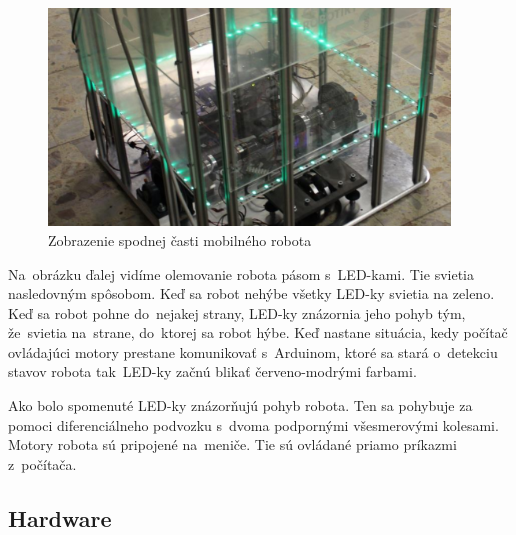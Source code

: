 \begin{figure}[!htbp]
	\begin{center}
		\includegraphics[width=0.95\textwidth]{img/robot.png}
	\end{center}
	\caption{Zobrazenie spodnej časti mobilného robota~\cite{timovyProjekt}}
	\label{fig:robot}
\end{figure}

\noindent Na~obrázku ďalej vidíme olemovanie robota pásom s~LED-kami. Tie svietia nasledovným spôsobom. Keď sa robot nehýbe všetky LED-ky svietia
na zeleno. Keď sa robot pohne do~nejakej strany, LED-ky znázornia jeho pohyb tým, že~svietia na~strane, do~ktorej sa robot hýbe. Keď nastane
situácia, kedy počítač ovládajúci motory prestane komunikovať s~Arduinom, ktoré sa stará o~detekciu stavov robota tak~LED-ky začnú blikať
červeno-modrými farbami.

Ako bolo spomenuté LED-ky znázorňujú pohyb robota. Ten sa pohybuje za pomoci diferenciálneho podvozku s~dvoma podpornými všesmerovými kolesami.
Motory robota sú pripojené na~meniče. Tie sú ovládané priamo príkazmi z~počítača.

\subsection{Hardware}

